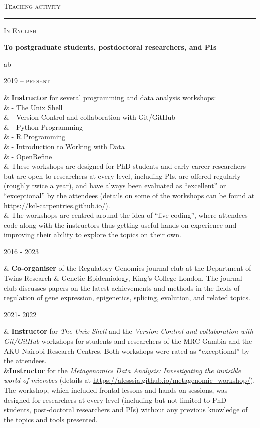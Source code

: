 \documentclass[a4paper,10pt]{article}
\newcommand{\mediumtitle}[1]{
	\vspace{0.2cm}
	{\noindent
	\Large \textsc{#1}\\[-2ex]
	\hrule
	\vspace{0.2cm}}
}
\newcommand{\smalltitle}[1]{
	\vspace{0.1cm}
	{\noindent 
	\large \textsc{#1}}
	\vspace{0.1cm}
}
\newenvironment{singletablelist}
{	\vspace{-0.2cm}
	\begin{longtable}[!h]{ab}}{\end{longtable}
}
\newcommand{\stlist}[2]{
	\hspace{-3cm}
	\noindent
	\begin{minipage}{0.24\textwidth}
	\begin{flushright}
	\textsc{#1}
	\end{flushright}
	\end{minipage}
	& #2\\[0.2cm]
}
\begin{document}

\newpage

\vspace{0.2cm}

\mediumtitle{Teaching activity}


\smalltitle{In English}

\vspace{0.2cm}

\noindent \textbf{To postgraduate students, postdoctoral researchers, and PIs}

\begin{singletablelist}
	
	\stlist{2019 -- present}{\textbf{Instructor} for several programming and data analysis workshops:\\
							& \hskip1cm - The Unix Shell\\
							& \hskip1cm - Version Control and collaboration with Git/GitHub\\
							& \hskip1cm - Python Programming\\
							& \hskip1cm - R Programming\\
							& \hskip1cm - Introduction to Working with Data\\
							& \hskip1cm - OpenRefine\\
							& These workshops are designed for PhD students and early career researchers but are open to researchers at every level, including PIs, are offered regularly (roughly twice a year), and have always been evaluated as ``excellent'' or ``exceptional'' by the attendees (details on some of the workshops can be found at \url{https://kcl-carpentries.github.io/}). \\
							& The workshops are centred around the idea of ``live coding'', where attendees code along with the instructors thus getting useful hands-on experience and improving their ability to explore the topics on their own. }				
	
	\stlist{2016 - 2023}{\textbf{Co-organiser} of the Regulatory Genomics journal club at the Department of Twins Research \& Genetic Epidemiology, King's College London. The journal club discusses papers on the latest achievements and methods in the fields of regulation of gene expression, epigenetics, splicing, evolution, and related topics. }
	
	
	\stlist{2021- 2022}{\textbf{Instructor} for \emph{The Unix Shell} and the \emph{Version Control and collaboration with Git/GitHub} workshops for students and researchers of the MRC Gambia and the AKU Nairobi Research Centres. Both workshops were rated as ``exceptional'' by the attendees.  \\
					 &\textbf{Instructor} for the \emph{Metagenomics Data Analysis: Investigating the invisible world of microbes} (details at \url{https://alesssia.github.io/metagenomic_workshop/}). The workshop, which included frontal lessons and hands-on sessions, was designed for researchers at every level (including but not limited to PhD students, post-doctoral researchers and PIs) without any previous knowledge of the topics and tools presented.}

\end{singletablelist}
\end{document}
